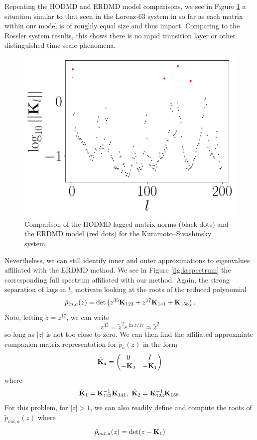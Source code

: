 \documentclass[a4paper,11pt]{article}
\begin{document}
Repeating the HODMD and ERDMD model comparisons, we see in Figure \ref{fig:model_comp_d_200} a situation similar to that seen in the Lorenz-63 system in so far as each matrix within our model is of roughly equal size and thus impact.  Comparing to the Rossler system results, this shows there is no rapid transition layer or other distinguished time scale phenomena.  
\begin{figure}[!h]
\centering
\includegraphics[width=.7\textwidth]{Kuramoto_norm_full_model_158}
\caption{Comparison of the HODMD lagged matrix norms (black dots) and the ERDMD model (red dots) for the Kuramoto--Sivashinsky system.}
\label{fig:model_comp_d_200}
\end{figure}
 
Nevertheless, we can still identify inner and outer approximations to eigenvalues affiliated with the ERDMD method.  We see in Figure \ref{fig:ksspectrum} the corresponding full spectrum affiliated with our method.  Again, the strong separation of lags in $l_{c}$ motivate looking at the roots of the reduced polynomial
\[
\tilde{p}_{in, a}(z) = \text{det}\left(z^{35}{\bf K}_{123} + z^{17}{\bf K}_{141} + {\bf K}_{158} \right).
\] 
Note, letting $\tilde{z}=z^{17}$, we can write 
\[
z^{35} = \tilde{z}^{2}e^{\ln \tilde{z}/17} \approx \tilde{z}^{2}
\]
so long as $|z|$ is not too close to zero.  We can then find the affiliated approxmiate companion matrix representation for $\tilde{p}_{a}(z)$ in the form
\[
\tilde{{\bf K}}_{a} = 
\begin{pmatrix} 
0 & I \\ 
-\tilde{{\bf K}}_{2} & -\tilde{{\bf K}}_{1} \\
\end{pmatrix}
\]
where 
\[
\tilde{{\bf K}}_{1} = {\bf K}_{123}^{-1}{\bf K}_{141}, ~ \tilde{{\bf K}}_{2} = {\bf K}_{123}^{-1}{\bf K}_{158}.
\]
For this problem, for $|z|>1$, we can also readily define and compute the roots of $\tilde{p}_{out,a}(z)$ where
\[
\tilde{p}_{out,a}(z) = \text{det}(z - {\bf K}_{1})
\]
\end{document}
